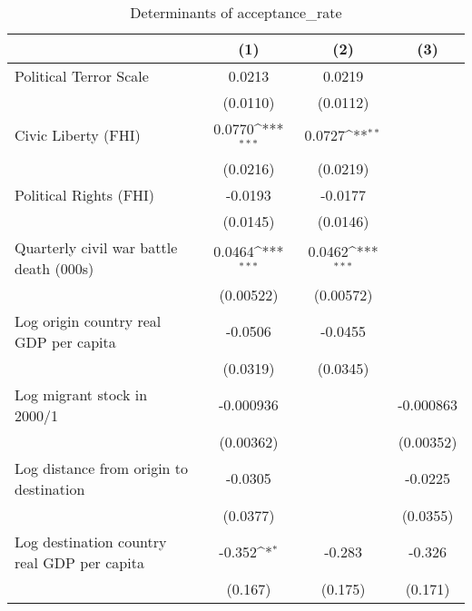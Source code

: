 \begin{table}[htbp]\centering
\def\sym#1{\ifmmode^{#1}\else\(^{#1}\)\fi}
\caption{Determinants of acceptance\_rate}
\begin{tabular}{l*{3}{c}}
\hline\hline
                    &\multicolumn{1}{c}{(1)}         &\multicolumn{1}{c}{(2)}         &\multicolumn{1}{c}{(3)}         \\
\hline
Political Terror Scale&      0.0213         &      0.0219         &                     \\
                    &    (0.0110)         &    (0.0112)         &                     \\
[1em]
Civic Liberty (FHI) &      0.0770\sym{***}&      0.0727\sym{**} &                     \\
                    &    (0.0216)         &    (0.0219)         &                     \\
[1em]
Political Rights (FHI)&     -0.0193         &     -0.0177         &                     \\
                    &    (0.0145)         &    (0.0146)         &                     \\
[1em]
Quarterly civil war battle death (000s)&      0.0464\sym{***}&      0.0462\sym{***}&                     \\
                    &   (0.00522)         &   (0.00572)         &                     \\
[1em]
Log origin country real GDP per capita&     -0.0506         &     -0.0455         &                     \\
                    &    (0.0319)         &    (0.0345)         &                     \\
[1em]
Log migrant stock in 2000/1&   -0.000936         &                     &   -0.000863         \\
                    &   (0.00362)         &                     &   (0.00352)         \\
[1em]
Log distance from origin to destination&     -0.0305         &                     &     -0.0225         \\
                    &    (0.0377)         &                     &    (0.0355)         \\
[1em]
Log destination country real GDP per capita&      -0.352\sym{*}  &      -0.283         &      -0.326         \\
                    &     (0.167)         &     (0.175)         &     (0.171)         \\

\end{tabular}
\end{table}
